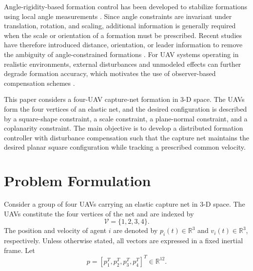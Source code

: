 \documentclass[lettersize,journal]{IEEEtran}
\begin{document}
Angle-rigidity-based formation control has been developed to stabilize formations using local angle measurements \cite{chen2021angleRigidity}. Since angle constraints are invariant under translation, rotation, and scaling, additional information is generally required when the scale or orientation of a formation must be prescribed. Recent studies have therefore introduced distance, orientation, or leader information to remove the ambiguity of angle-constrained formations \cite{chen2022stabilizing,chen2023angleConstrained,li2025localInfo}. For UAV systems operating in realistic environments, external disturbances and unmodeled effects can further degrade formation accuracy, which motivates the use of observer-based compensation schemes \cite{wang2025esoMultiUAV,ren2026observer}.

This paper considers a four-UAV capture-net formation in 3-D space. The UAVs form the four vertices of an elastic net, and the desired configuration is described by a square-shape constraint, a scale constraint, a plane-normal constraint, and a coplanarity constraint. The main objective is to develop a distributed formation controller with disturbance compensation such that the capture net maintains the desired planar square configuration while tracking a prescribed common velocity.

\section{Problem Formulation}

Consider a group of four UAVs carrying an elastic capture net in 3-D space. The UAVs constitute the four vertices of the net and are indexed by
\begin{equation}
\label{eq:vertex-set}
\mathcal V=\{1,2,3,4\}.
\end{equation}
The position and velocity of agent \(i\) are denoted by \(p_i(t)\in\mathbb R^3\) and \(v_i(t)\in\mathbb R^3\), respectively. Unless otherwise stated, all vectors are expressed in a fixed inertial frame. Let
\begin{equation}
\label{eq:stacked-position}
p=\left[p_1^T,p_2^T,p_3^T,p_4^T\right]^T\in\mathbb R^{12}.
\end{equation}
\end{document}
